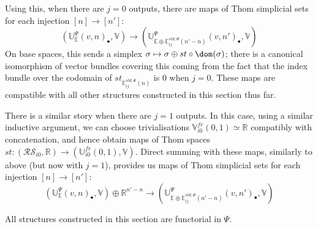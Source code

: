 \documentclass{TPmod}
\def\bE{\mathbb{E}}
\def\bR{\mathbb{R}}
\def\bU{\mathbb{U}}
\def\bV{\mathbb{V}}
\newcommand{\cR}{\mathcal{R}}
\newcommand{\cS}{\mathcal{S}}
\renewcommand{\cong}{\simeq}
\numberwithin{equation}{section}
\begin{document}
Using this, when there are $j=0$ outputs, there are maps of Thom simplicial sets for each injection $[n] \to [n']$:
\begin{equation}
    \left(\bU^\Psi_\bE(v, n)_\bullet, \bV\right) \to \left(\bU^\Psi_{\bE \oplus \bE^{std, \Psi}_{ij}(n'-n)}(v, n')_\bullet, \bV\right)
\end{equation}
On base spaces, this sends a simplex $\sigma \mapsto \sigma \oplus st\circ\dom(\sigma)$; there is a canonical isomorphism of vector bundles covering this coming from the fact that the index bundle over the codomain of $st_{\bE^{std, \Psi}_{ij}(n)}$ is $0$ when $j=0$. These maps are compatible with all other structures constructed in this section thus far.

There is a similar story when there are $j=1$ outputs. In this case, using a similar inductive argument, we can choose trivialisations $\bV^{fr}_{i0}(0,1) \cong \bR$ compatibly with concatenation, and hence obtain maps of Thom spaces $st: (\cR\cS_{i0}, \bR) \to (\bU^{fr}_{i0}(0,1), \bV)$. Direct summing with these maps, similarly to above (but now with $j=1$), provides us maps of Thom simplicial sets for each injection $[n] \to [n']$:
\begin{equation}
    \left(\bU^\Psi_\bE(v,n)_\bullet, \bV\right) \oplus \bR^{n'-n} \to \left(\bU^\Psi_{\bE \oplus \bE^{std, \Psi}_{ij}(n'-n)}(v, n')_\bullet, \bV\right)
\end{equation}

\begin{rmk}
    All structures constructed in this section are functorial in $\Psi$.
\end{rmk}
\end{document}
